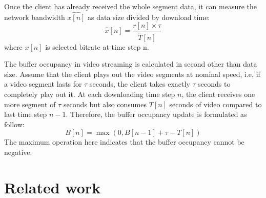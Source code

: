 \documentclass[journal]{IEEEtran}
\begin{document}
\par Once the client has already received the whole segment data, it can measure the network bandwidth $\hat{x[n]}$ as data size divided by download time: 
\begin{equation}
\hat{x}[n]=\dfrac{r[n]\times\tau}{\tilde{T}[n]}
\label{Bandwidth}
\end{equation}
where $x[n]$ is selected bitrate at time step n.
\par 
The buffer occupancy in video streaming is calculated in second other than data size. Assume that the client plays out the video segments at nominal speed, i.e, if a video segment lasts for $\tau$ seconds, the client takes exactly $\tau$ seconds to completely play out it. At each downloading time step $n$, the client receives one more segment of $\tau$ seconds but also consumes $T[n]$ seconds of video compared to last time step $n-1$. Therefore, the buffer occupancy update is formulated as follow:
\begin{equation}
B[n]=\max(0,B[n-1]+\tau-T[n])
\end{equation}
The maximum operation here indicates that the buffer occupancy cannot be negative.
\section{Related work}
\end{document}
